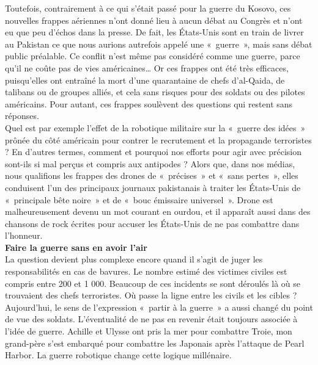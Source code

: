 \documentclass[8pt]{article}
\begin{document}
Toutefois, contrairement à ce qui s’était passé pour la guerre du Kosovo, ces nouvelles frappes aériennes n’ont donné lieu à aucun débat au Congrès et n’ont eu que peu d’échos dans la presse. De fait, les États-Unis sont en train de livrer au Pakistan ce que nous aurions autrefois appelé une «~guerre~», mais sans débat public préalable. Ce conflit n’est même pas considéré comme une guerre, parce qu’il ne coûte pas de vies américaines… Or ces frappes ont été très efficaces, puisqu’elles ont entraîné la mort d’une quarantaine de chefs d’al-Qaida, de talibans ou de groupes alliés, et cela sans risques pour des soldats ou des pilotes américains. Pour autant, ces frappes soulèvent des questions qui restent sans réponses.\\

Quel est par exemple l’effet de la robotique militaire sur la «~guerre des idées~» prônée du côté américain pour contrer le recrutement et la propagande terroristes ? En d’autres termes, comment et pourquoi nos efforts pour agir avec précision sont-ils si mal perçus et compris aux antipodes ? Alors que, dans nos médias, nous qualifions les frappes des drones de «~précises~» et «~sans pertes~», elles conduisent l’un des principaux journaux pakistanais à traiter les États-Unis de «~principale bête noire~» et de «~bouc émissaire universel~». Drone est malheureusement devenu un mot courant en ourdou, et il apparaît aussi dans des chansons de rock écrites pour accuser les États-Unis de ne pas combattre dans l’honneur.\\

\textbf{Faire la guerre sans en avoir l’air}\\

La question devient plus complexe encore quand il s’agit de juger les responsabilités en cas de bavures. Le nombre estimé des victimes civiles est compris entre 200 et 1 000. Beaucoup de ces incidents se sont déroulés là où se trouvaient des chefs terroristes. Où passe la ligne entre les civils et les cibles ?\\

Aujourd’hui, le sens de l’expression «~partir à la guerre~» a aussi changé du point de vue des soldats. L’éventualité de ne pas en revenir était toujours associée à l’idée de guerre. Achille et Ulysse ont pris la mer pour combattre Troie, mon grand-père s’est embarqué pour combattre les Japonais après l’attaque de Pearl Harbor. La guerre robotique change cette logique millénaire.\\
\end{document}
